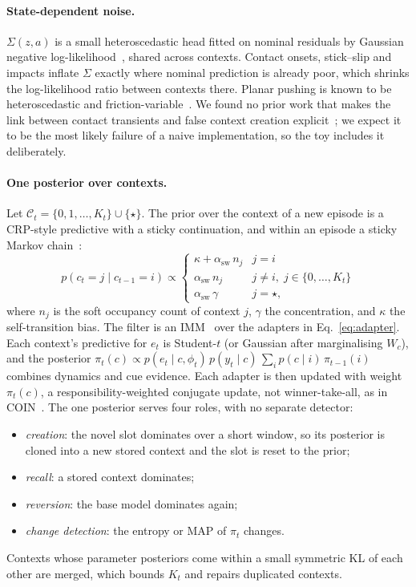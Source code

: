 \documentclass[10pt]{article}
\newcommand{\C}{\mathcal{C}}
\newcommand{\novel}{\star}
\begin{document}
\paragraph{State-dependent noise.}
$\Sigma(z,a)$ is a small heteroscedastic head fitted on nominal residuals by Gaussian negative
log-likelihood~\cite{kersting2007hetgp}, shared across contexts. Contact onsets, stick--slip and
impacts inflate $\Sigma$ exactly where nominal prediction is already poor, which shrinks the
log-likelihood ratio between contexts there. Planar pushing is known to be heteroscedastic and
friction-variable~\cite{bauza2017probpush,ma2018friction}. We found no prior work that makes the link
between contact transients and false context creation explicit~\cite{haddadin2017collisions}; we
expect it to be the most likely failure of a naive implementation, so the toy includes it deliberately.

\paragraph{One posterior over contexts.}
Let $\C_t=\{0,1,\dots,K_t\}\cup\{\novel\}$. The prior over the context of a new episode is a
CRP-style predictive with a sticky continuation, and within an episode a sticky Markov
chain~\cite{fox2011sticky}:
\begin{equation}
  p(c_t=j\mid c_{t-1}=i) \propto
  \begin{cases}
    \kappa+\alpha_{\text{sw}}\, n_j & j=i\\
    \alpha_{\text{sw}}\, n_j & j\neq i,\; j\in\{0,\dots,K_t\}\\
    \alpha_{\text{sw}}\,\gamma & j=\novel,
  \end{cases}
  \label{eq:prior}
\end{equation}
where $n_j$ is the soft occupancy count of context $j$, $\gamma$ the concentration, and $\kappa$ the
self-transition bias. The filter is an IMM~\cite{blom1988imm} over the adapters in
Eq.~\eqref{eq:adapter}. Each context's predictive for $e_t$ is Student-$t$ (or Gaussian after
marginalising $W_c$), and the posterior $\pi_t(c)\propto p(e_t\mid c,\phi_t)\,p(y_t\mid c)\,
\sum_i p(c\mid i)\,\pi_{t-1}(i)$ combines dynamics and cue evidence. Each adapter is then updated with
weight $\pi_t(c)$, a responsibility-weighted conjugate update, not winner-take-all, as in
COIN~\cite{heald2021coin}. The one posterior serves four roles, with no separate detector:
\begin{itemize}
  \item \emph{creation}: the novel slot dominates over a short window, so its posterior is cloned into
  a new stored context and the slot is reset to the prior;
  \item \emph{recall}: a stored context dominates;
  \item \emph{reversion}: the base model dominates again;
  \item \emph{change detection}: the entropy or MAP of $\pi_t$ changes.
\end{itemize}
Contexts whose parameter posteriors come within a small symmetric KL of each other are merged, which
bounds $K_t$ and repairs duplicated contexts.
\end{document}
